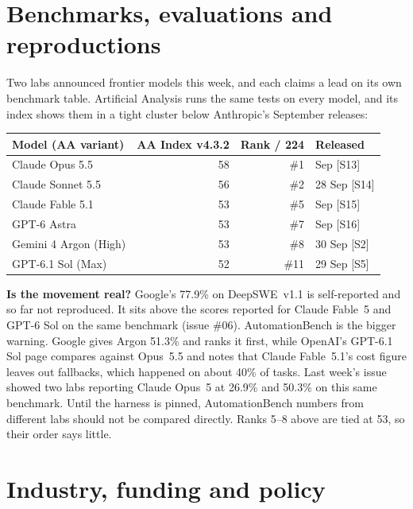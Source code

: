 \documentclass[11pt,a4paper]{article}
\newcommand{\srcref}[1]{\textcolor{brandaccent}{[S#1]}}
\begin{document}
\section{Benchmarks, evaluations and reproductions}

Two labs announced frontier models this week, and each claims a lead on its own benchmark
table. Artificial Analysis runs the same tests on every model, and its index shows them
in a tight cluster below Anthropic's September releases:

{\small
\begin{tabularx}{\textwidth}{@{}X r r l@{}}
\toprule
\textbf{Model (AA variant)} & \textbf{AA Index v4.3.2} & \textbf{Rank / 224} & \textbf{Released} \\
\midrule
Claude Opus 5.5            & 58 & \#1  & Sep \srcref{13} \\
Claude Sonnet 5.5          & 56 & \#2  & 28 Sep \srcref{14} \\
Claude Fable 5.1           & 53 & \#5  & Sep \srcref{15} \\
GPT-6 Astra                & 53 & \#7  & Sep \srcref{16} \\
Gemini 4 Argon (High)      & 53 & \#8  & 30 Sep \srcref{2} \\
GPT-6.1 Sol (Max)          & 52 & \#11 & 29 Sep \srcref{5} \\
\bottomrule
\end{tabularx}}
\vspace{0.4em}

\textbf{Is the movement real?} Google's 77.9\% on DeepSWE~v1.1 is self-reported and so far
not reproduced. It sits above the scores reported for Claude Fable~5 and GPT-6 Sol
on the same benchmark (issue \#06). AutomationBench is the bigger warning. Google gives Argon 51.3\% and
ranks it first, while OpenAI's GPT-6.1 Sol page compares against Opus~5.5 and notes that
Claude Fable~5.1's cost figure leaves out fallbacks, which happened on about 40\% of tasks.
Last week's issue showed two labs reporting Claude Opus~5 at 26.9\% and 50.3\% on this same
benchmark. Until the harness is pinned, AutomationBench numbers from different labs should
not be compared directly. Ranks 5--8 above are tied at 53, so their order says little.

\section{Industry, funding and policy}
\end{document}
